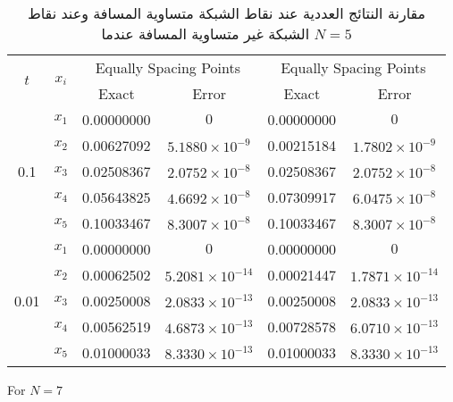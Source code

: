 	\begin{table}[ht]
		\renewcommand{\arraystretch}{1.5}
		\centering
		\begin{english}
\begin{tabular}{|c|c|c|c|c|c|}
			\hline
			\multirow{2}{*}{\( t \)} & \multirow{2}{*}{\( x_i \)} & \multicolumn{2}{c|}{Equally Spacing Points} & \multicolumn{2}{c|}{Equally Spacing Points} \\
			\cline{3-6}
			& & Exact & Error & Exact & Error \\
			\hline
			\multirow{5}{*}{0.1} & \( x_1 \) & 0.00000000 & \( 0 \) & 0.00000000 & \( 0 \) \\
			& \( x_2 \) & 0.00627092 & \( 5.1880 \times 10^{-9} \) & 0.00215184 & \( 1.7802 \times 10^{-9} \) \\
			& \( x_3 \) & 0.02508367 & \( 2.0752 \times 10^{-8} \) & 0.02508367 & \( 2.0752 \times 10^{-8} \) \\
			& \( x_4 \) & 0.05643825 & \( 4.6692 \times 10^{-8} \) & 0.07309917 & \( 6.0475 \times 10^{-8} \) \\
			& \( x_5 \) & 0.10033467 & \( 8.3007 \times 10^{-8} \) & 0.10033467 & \( 8.3007 \times 10^{-8} \) \\
			\hline
			\multirow{5}{*}{0.01} & \( x_1 \) & 0.00000000 & \( 0 \) & 0.00000000 & \( 0 \) \\
			& \( x_2 \) & 0.00062502 & \( 5.2081 \times 10^{-14} \) & 0.00021447 & \( 1.7871 \times 10^{-14} \) \\
			& \( x_3 \) & 0.00250008 & \( 2.0833 \times 10^{-13} \) & 0.00250008 & \( 2.0833 \times 10^{-13} \) \\
			& \( x_4 \) & 0.00562519 & \( 4.6873 \times 10^{-13} \) & 0.00728578 & \( 6.0710 \times 10^{-13} \) \\
			& \( x_5 \) & 0.01000033 & \( 8.3330 \times 10^{-13} \) & 0.01000033 & \( 8.3330 \times 10^{-13} \) \\
			\hline
		\end{tabular}
\end{english}
	\caption{\centering مقارنة النتائج العددية عند نقاط الشبكة متساوية المسافة وعند نقاط الشبكة غير متساوية المسافة عندما $N=5$}
\label{tab:firstN5}
\end{table}
	
	For \( N = 7 \)
	
